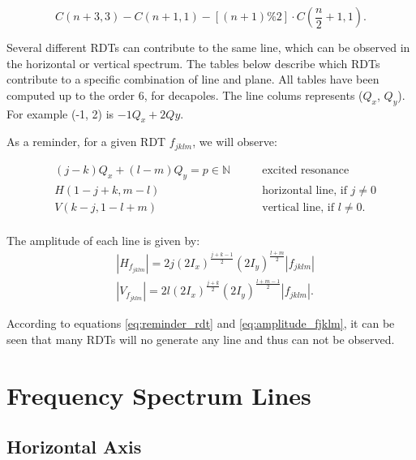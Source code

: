 \begin{equation}
    C(n+3, 3) - C(n+1,1) - \left[(n+1) \% 2\right] \cdot C\left(\frac{n}{2}+1, 1\right).
    \label{eq:number_rdts}
\end{equation}

Several different RDTs can contribute to the same line, which can be observed in the horizontal or vertical spectrum. The tables below describe which RDTs contribute to a specific combination of line and plane.
All tables have been computed up to the order 6, for decapoles.
The line colums represents ($Q_x$, $Q_y$). For example (-1, 2) is \(-1Q_x + 2Qy\).

As a reminder, for a given RDT $f_{jklm}$, we will observe:

\begin{equation}\begin{aligned}
& (j-k)Q_x + (l-m)Q_y = p \in \mathbb{N} \quad\quad& \mbox{excited resonance}\\
& H(1 - j + k, m - l) \quad\quad& \mbox{horizontal line, if } j \ne 0 \\
& V(k - j, 1 - l + m) \quad\quad& \mbox{vertical line, if } l \ne 0. \\
\end{aligned}
\label{eq:reminder_rdt}
\end{equation}

The amplitude of each line is given by:
\begin{equation}
    \begin{aligned}
    &|H_{f_{jklm}}| = 2 j (2 I_x)^\frac{j+k-1}{2} (2 I_y)^\frac{l+m}{2} |f_{jklm}| \\
    &|V_{f_{jklm}}| = 2 l (2 I_x)^\frac{j+k}{2} (2 I_y)^\frac{l+m-1}{2} |f_{jklm}|.
    \label{eq:amplitude_fjklm}
    \end{aligned}
\end{equation}

According to equations \ref{eq:reminder_rdt} and \ref{eq:amplitude_fjklm}, it can be seen that many RDTs will no generate any line and thus can not be observed.

\section{Frequency Spectrum Lines}

\subsection{Horizontal Axis}

